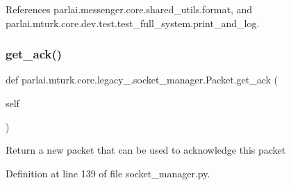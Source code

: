 References parlai.\+messenger.\+core.\+shared\+\_\+utils.\+format, and parlai.\+mturk.\+core.\+dev.\+test.\+test\+\_\+full\+\_\+system.\+print\+\_\+and\+\_\+log.

\mbox{\label{classparlai_1_1mturk_1_1core_1_1legacy__2018_1_1socket__manager_1_1Packet_ab28122db923d67d773b6c4af0360e6b0}} 
\subsubsection{\texorpdfstring{get\+\_\+ack()}{get\_ack()}}
{\footnotesize\ttfamily def parlai.\+mturk.\+core.\+legacy\+\_.\+socket\+\_\+manager.\+Packet.\+get\+\_\+ack (\begin{DoxyParamCaption}\item[{}]{self }\end{DoxyParamCaption})}

\begin{DoxyVerb}Return a new packet that can be used to acknowledge this packet\end{DoxyVerb}
 

Definition at line 139 of file socket\+\_\+manager.\+py.



